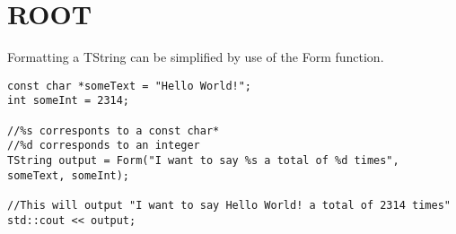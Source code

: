 \chapter{ROOT}
\thispagestyle{fancy}

Formatting a TString can be simplified by use of the Form function.

\begin{lstlisting}
const char *someText = "Hello World!";
int someInt = 2314;

//%s corresponts to a const char*
//%d corresponds to an integer
TString output = Form("I want to say %s a total of %d times", someText, someInt);

//This will output "I want to say Hello World! a total of 2314 times"
std::cout << output;
\end{lstlisting}